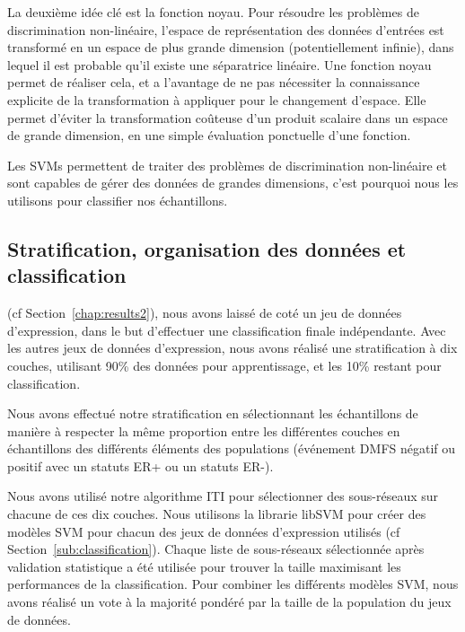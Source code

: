 			La deuxième idée clé est la fonction noyau.
			Pour résoudre les problèmes de discrimination non-linéaire, l'espace de représentation des données d'entrées est transformé en un espace de plus grande dimension (potentiellement infinie), dans lequel il est probable qu'il existe une séparatrice linéaire.
			Une fonction noyau permet de réaliser cela, et a l'avantage de ne pas nécessiter la connaissance explicite de la transformation à appliquer pour le changement d'espace.
			Elle permet d'éviter la transformation coûteuse d'un produit scalaire dans un espace de grande dimension, en une simple évaluation ponctuelle d'une fonction.

			Les \acp{SVM} permettent de traiter des problèmes de discrimination non-linéaire et sont capables de gérer des données de grandes dimensions, c'est pourquoi nous les utilisons pour classifier nos échantillons.

		\subsection{\textcolor{green!45!black}{Stratification, organisation des données et classification}}\label{sub:stratification}
			 (cf Section~\ref{chap:results2}), nous avons laissé de coté un jeu de données d'expression, dans le but d'effectuer une classification finale indépendante.
			Avec les autres jeux de données d'expression, nous avons réalisé une stratification à dix couches, utilisant 90\% des données pour apprentissage, et les 10\% restant pour classification.

			Nous avons effectué notre stratification en sélectionnant les échantillons de manière à respecter la même proportion entre les différentes couches en échantillons des différents éléments des populations (événement \acs{DMFS} négatif ou positif avec un statuts ER+ ou un statuts ER-).
			
			Nous avons utilisé notre algorithme ITI pour sélectionner des sous-réseaux sur chacune de ces dix couches.
			Nous utilisons la librarie libSVM pour créer des modèles \ac{SVM} pour chacun des jeux de données d'expression utilisés (cf Section~\ref{sub:classification}).
			Chaque liste de sous-réseaux sélectionnée après validation statistique a été utilisée pour trouver la taille maximisant les performances de la classification.
			Pour combiner les différents modèles \ac{SVM}, nous avons réalisé un vote à la majorité pondéré par la taille de la population du jeux de données.

